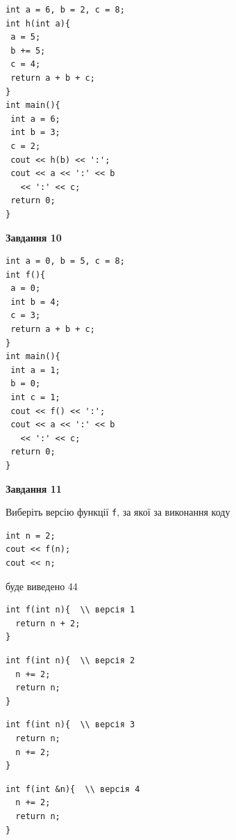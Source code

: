 \documentclass[12pt, ukrainian]{article}
\def\code#1{\Verb!#1!}
\begin{document}
{\begin {large}
\begin{minipage}[t]{7.0cm}
\begin{verbatim}
int a = 6, b = 2, c = 8;
int h(int a){
 a = 5;
 b += 5;
 c = 4;
 return a + b + c;
}
int main(){
 int a = 6;
 int b = 3;
 c = 2;
 cout << h(b) << ':';
 cout << a << ':' << b 
   << ':' << c;
 return 0;
}
\end{verbatim}



\begin{center}
\textbf{Завдання 10}
\end{center}
\vspace{-8mm}

\begin{verbatim}
int a = 0, b = 5, c = 8;
int f(){
 a = 0;
 int b = 4;
 c = 3;
 return a + b + c;
}
int main(){
 int a = 1;
 b = 0;
 int c = 1;
 cout << f() << ':';
 cout << a << ':' << b 
   << ':' << c;
 return 0;
}
\end{verbatim}

\end{minipage}
\vline \hspace{1mm}
\begin{minipage}[t]{11.0cm}

\begin{center}
\textbf{Завдання 11}
\end{center}
Виберіть версію функції \code{f}, за якої за виконання коду
\begin{verbatim}
int n = 2;
cout << f(n);
cout << n;
\end{verbatim}

буде виведено 44

\begin{verbatim}
int f(int n){  \\ версія 1
  return n + 2;
}
\end{verbatim}

\vspace{-8mm}\begin{verbatim}
int f(int n){  \\ версія 2
  n += 2;
  return n;
}
\end{verbatim}

\vspace{-8mm}\begin{verbatim}
int f(int n){  \\ версія 3
  return n;
  n += 2;
}
\end{verbatim}

\vspace{-8mm}\begin{verbatim}
int f(int &n){  \\ версія 4
  n += 2;
  return n;
}
\end{verbatim}




\end{minipage}
\end{large}}
\end{document}
